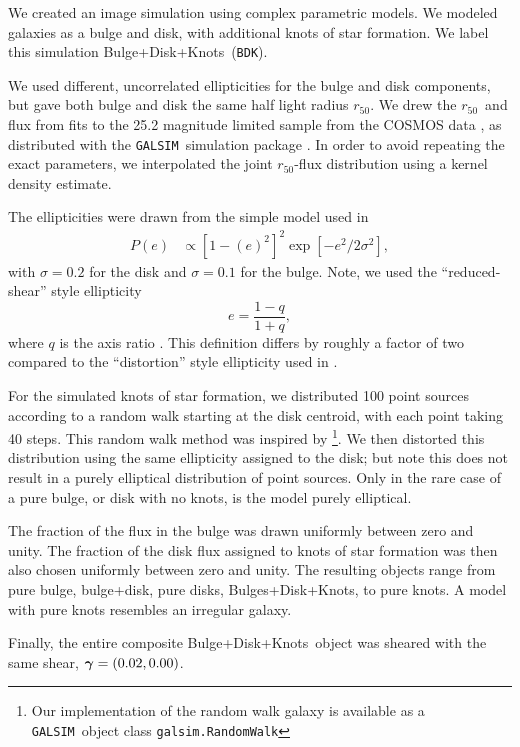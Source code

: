 \documentclass[iop]{emulateapj}
\newcommand{\hlr}{$r_{50}$}
\newcommand{\vecg}{\mbox{\boldmath $\gamma$}}
\newcommand{\bdkfull}{Bulge+Disk+Knots}
\newcommand{\bdksim}{\texttt{BDK}}
\newcommand{\galsim}{\texttt{GALSIM}}
\begin{document}
We created an image simulation using complex parametric models.  We modeled
galaxies as a bulge and disk, with additional knots of star formation.  We
label this simulation \bdkfull\ (\bdksim).

We used different, uncorrelated ellipticities for the bulge and disk
components, but gave both bulge and disk the same half light radius \hlr.
We drew the \hlr\ and flux from fits \citep{LacknerGunn2012} to the 25.2
magnitude limited sample from the COSMOS data
\citep{Scoville2007a,Scoville2007b}, as distributed with the \galsim\
simulation package \citep{GALSIM2015}.  In order to avoid repeating the exact
parameters, we interpolated the joint \hlr-flux distribution using a kernel
density estimate.

The ellipticities were drawn from the simple model used in \cite{bfd2016}
\begin{align} \label{eq:edist}
    P(e) &\propto \left[1-(e)^2\right]^2 \exp\left[-e^2/2\sigma^2\right],
\end{align}
with $\sigma=0.2$ for the disk and $\sigma=0.1$ for the bulge.  Note, we used
the ``reduced-shear'' style ellipticity
\begin{equation}
    e = \frac{1-q}{1+q},
\end{equation}
where $q$ is the axis ratio \citep{bj02}.  This definition differs by roughly a
factor of two compared to the ``distortion'' style ellipticity
used in \citet{bfd2016}.

For the simulated knots of star formation, we distributed 100 point sources
according to a random walk starting at the disk centroid, with each point
taking 40 steps.  This random walk method was inspired by
\cite{Zhang2008FourierQuadI}\footnote{Our implementation
of the random walk galaxy is available as a \galsim\ object class \texttt{galsim.RandomWalk}}.
We then distorted this distribution using the same ellipticity assigned to the
disk; but note this does not result in a purely elliptical distribution of
point sources.  Only in the rare case of a pure bulge, or disk with no knots,
is the model purely elliptical.

The fraction of the flux in the bulge was drawn uniformly between zero and
unity.  The fraction of the disk flux assigned to knots of star formation
was then also chosen uniformly between zero and unity.  The resulting 
objects range from pure bulge, bulge+disk, pure disks, Bulges+Disk+Knots, 
to pure knots. A model with pure knots resembles an irregular galaxy.

Finally, the entire composite \bdkfull\ object was sheared with the same
shear, $\vecg = (0.02, 0.00)$.
\end{document}
